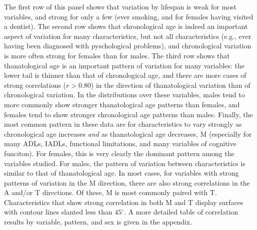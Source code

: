\documentclass[11pt,oneside]{article} %
\begin{document}
The first row of this panel shows that variation by lifespan is weak for most
variables, and strong for only a few (ever smoking, and for females having
visited a dentist).
The second row shows that chronological age is indeed an important aspect of variation for many characteristics, but not
all characteristics (e.g., ever having been diagnosed with pyschological
problems), and chronological variation is more often strong for females than for
males.
The third row shows that thanatological age is an important pattern of variation
for many variables: the lower tail is thinner than that of chronological age,
and there are more cases of strong correlations ($r>0.80$) in the direction of thanatological variation than
of chronological variation. In the distributions over these variables, males tend to
more commonly show stronger thanatological age patterns than females, and
females tend to show stronger chronological age patterns than males. Finally, the most common pattern in these data are for
characteristics to vary strongly as chronological age increases \textit{and} as
thanatological age decreases, M (especially for many ADLs, IADLs, functional
limitations, and many variables of cognitive funciton).
For females, this is very clearly the dominant pattern among the variables studied. For males, the pattern of variation between
characteristics is similar to that of thanatological age. In most cases, for
variables with strong patterns of variation in the M direction, there are also
strong correlations in the A and/or T directions. Of these, M is most commonly
paired with T. Characteristics that show strong correlation in both M and T
display surfaces with contour lines slanted less than $45^\circ$. A more
detailed table of correlation results by variable, pattern, and sex is given in
the appendix.
\end{document}
